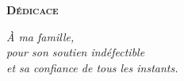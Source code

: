 \thispagestyle{empty}
\btpLightFrame

\vspace*{6cm}
\begin{center}
  {\Large\bfseries\scshape\color{btpdeep} Dédicace}

  \vspace{1cm}
  \pgfornament[width=4.6cm, color=btpblue]{\btpOrnFlourish}
  \vspace{2cm}

  {\Large\itshape\color{btpslate} À ma famille,}\\[0.8cm]
  {\large\itshape\color{btpslate} pour son soutien indéfectible}\\[4pt]
  {\large\itshape\color{btpslate} et sa confiance de tous les instants.}

  \vspace{2cm}
  \pgfornament[width=3.2cm, color=btpsky]{\btpOrnSmall}
\end{center}

\clearpage
